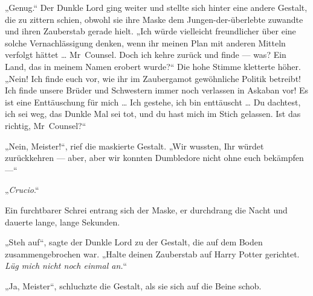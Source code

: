 „Genug.“ Der Dunkle Lord ging weiter und stellte sich hinter eine andere Gestalt, die zu zittern schien, obwohl sie ihre Maske dem Jungen-der-überlebte zuwandte und ihren Zauberstab gerade hielt.
„Ich würde vielleicht freundlicher über eine solche Vernachlässigung denken, wenn ihr meinen Plan mit anderen Mitteln verfolgt hättet … Mr~Counsel. Doch ich kehre zurück und finde — was? Ein Land, das in meinem Namen erobert wurde?“
Die hohe Stimme kletterte höher.
„Nein! Ich finde euch vor, wie ihr im Zaubergamot gewöhnliche Politik betreibt! Ich finde unsere Brüder und Schwestern immer noch verlassen in Askaban vor! Es ist eine Enttäuschung für mich … Ich gestehe, ich bin enttäuscht … Du dachtest, ich sei weg, das Dunkle Mal sei tot, und du hast mich im Stich gelassen. Ist das richtig, Mr~Counsel?“

„Nein, Meister!“, rief die maskierte Gestalt.
„Wir wussten, Ihr würdet zurückkehren — aber, aber wir konnten Dumbledore nicht ohne euch bekämpfen —“

„\emph{Crucio}.“

Ein furchtbarer Schrei entrang sich der Maske, er durchdrang die Nacht und dauerte lange, lange Sekunden.

„Steh auf“, sagte der Dunkle Lord zu der Gestalt, die auf dem Boden zusammengebrochen war.
„Halte deinen Zauberstab auf Harry Potter gerichtet. \emph{Lüg mich nicht noch einmal an.}“

„Ja, Meister“, schluchzte die Gestalt, als sie sich auf die Beine schob.

